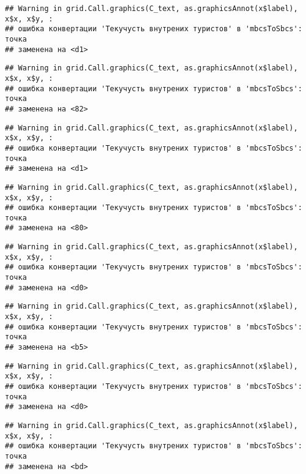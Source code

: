 \documentclass[
]{article}
\begin{document}
\begin{verbatim}
## Warning in grid.Call.graphics(C_text, as.graphicsAnnot(x$label), x$x, x$y, :
## ошибка конвертации 'Текучусть внутрених туристов' в 'mbcsToSbcs': точка
## заменена на <d1>
\end{verbatim}

\begin{verbatim}
## Warning in grid.Call.graphics(C_text, as.graphicsAnnot(x$label), x$x, x$y, :
## ошибка конвертации 'Текучусть внутрених туристов' в 'mbcsToSbcs': точка
## заменена на <82>
\end{verbatim}

\begin{verbatim}
## Warning in grid.Call.graphics(C_text, as.graphicsAnnot(x$label), x$x, x$y, :
## ошибка конвертации 'Текучусть внутрених туристов' в 'mbcsToSbcs': точка
## заменена на <d1>
\end{verbatim}

\begin{verbatim}
## Warning in grid.Call.graphics(C_text, as.graphicsAnnot(x$label), x$x, x$y, :
## ошибка конвертации 'Текучусть внутрених туристов' в 'mbcsToSbcs': точка
## заменена на <80>
\end{verbatim}

\begin{verbatim}
## Warning in grid.Call.graphics(C_text, as.graphicsAnnot(x$label), x$x, x$y, :
## ошибка конвертации 'Текучусть внутрених туристов' в 'mbcsToSbcs': точка
## заменена на <d0>
\end{verbatim}

\begin{verbatim}
## Warning in grid.Call.graphics(C_text, as.graphicsAnnot(x$label), x$x, x$y, :
## ошибка конвертации 'Текучусть внутрених туристов' в 'mbcsToSbcs': точка
## заменена на <b5>
\end{verbatim}

\begin{verbatim}
## Warning in grid.Call.graphics(C_text, as.graphicsAnnot(x$label), x$x, x$y, :
## ошибка конвертации 'Текучусть внутрених туристов' в 'mbcsToSbcs': точка
## заменена на <d0>
\end{verbatim}

\begin{verbatim}
## Warning in grid.Call.graphics(C_text, as.graphicsAnnot(x$label), x$x, x$y, :
## ошибка конвертации 'Текучусть внутрених туристов' в 'mbcsToSbcs': точка
## заменена на <bd>
\end{verbatim}
\end{document}
